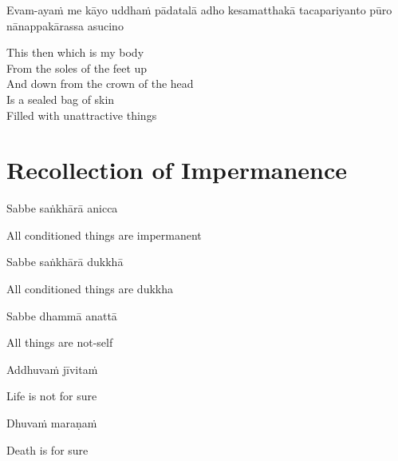 \begin{pali-hang}
Evam-ayaṁ me kāyo uddhaṁ pādatalā adho kesamatthakā tacapariyanto pūro nānappakārassa asucino
\end{pali-hang}

\begin{english-verses}
  This then which is my body\\
  From the soles of the feet up\\
  And down from the crown of the head\\
  Is a sealed bag of skin\\
  Filled with unattractive things
\end{english-verses}



\suttaRef{[DN 22]}


\section{Recollection of Impermanence}
\label{recollection-impermanence}

\begin{leader}
\end{leader}

Sabbe saṅkhārā anicca

\begin{english}
  All conditioned things are impermanent
\end{english}

Sabbe saṅkhārā dukkhā

\begin{english}
  All conditioned things are dukkha
\end{english}

Sabbe dhammā anattā

\begin{english}
  All things are not-self
\end{english}

\suttaRef{[Dhp 277-279]}

Addhuvaṁ jīvitaṁ

\begin{english}
  Life is not for sure
\end{english}

Dhuvaṁ maraṇaṁ

\begin{english}
  Death is for sure
\end{english}

